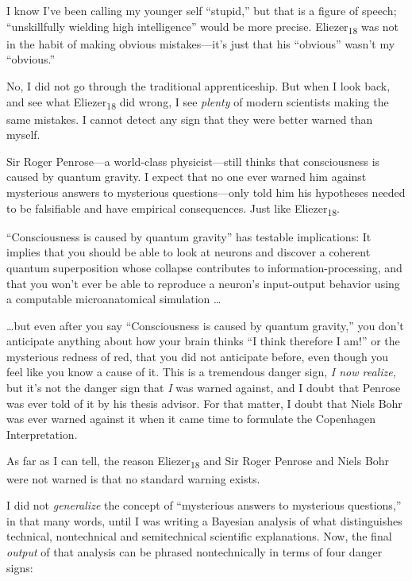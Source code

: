 {
 I know I've been calling my younger self
``stupid,'' but that is a figure of
speech; ``unskillfully wielding high
intelligence'' would be more precise.
Eliezer\textsubscript{18} was not in the habit of making obvious
mistakes---it's just that his
``obvious'' wasn't
my ``obvious.''}

{
 No, I did not go through the traditional apprenticeship. But when
I look back, and see what Eliezer\textsubscript{18} did wrong, I see
\textit{plenty} of modern scientists making the same mistakes. I cannot
detect any sign that they were better warned than myself.}

{
 Sir Roger Penrose---a world-class physicist---still thinks that
consciousness is caused by quantum gravity. I expect that no one ever
warned him against mysterious answers to mysterious questions---only
told him his hypotheses needed to be falsifiable and have empirical
consequences. Just like Eliezer\textsubscript{18}.}

{
 ``Consciousness is caused by quantum
gravity'' has testable implications: It implies that
you should be able to look at neurons and discover a coherent quantum
superposition whose collapse contributes to information-processing, and
that you won't ever be able to reproduce a
neuron's input-output behavior using a computable
microanatomical simulation \ldots}

{
 \ldots but even after you say ``Consciousness is
caused by quantum gravity,'' you
don't anticipate anything about how your brain thinks
``I think therefore I am!'' or the
mysterious redness of red, that you did not anticipate before, even
though you feel like you know a cause of it. This is a tremendous
danger sign, \textit{I now realize,} but it's not the
danger sign that \textit{I} was warned against, and I doubt that
Penrose was ever told of it by his thesis advisor. For that matter, I
doubt that Niels Bohr was ever warned against it when it came time to
formulate the Copenhagen Interpretation.}

{
 As far as I can tell, the reason Eliezer\textsubscript{18} and Sir
Roger Penrose and Niels Bohr were not warned is that no standard
warning exists.}

{
 I did not \textit{generalize} the concept of
``mysterious answers to mysterious
questions,'' in that many words, until I was writing
a Bayesian analysis of what distinguishes technical, nontechnical and
semitechnical scientific explanations. Now, the final \textit{output}
of that analysis can be phrased nontechnically in terms of four danger
signs:}

